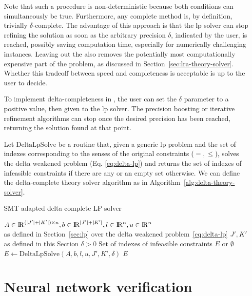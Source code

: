 \documentclass[runningheads]{llncs}
\begin{document}
Note that such a procedure is non-deterministic because both conditions can simultaneously be true.
Furthermore, any complete method is, by definition, trivially $\delta$-complete.
The advantage of this approach is that the \gls{lp} solver can stop refining the solution as soon as the arbitrary precision $\delta$, indicated by the user, is reached, possibly saving computation time, especially for numerically challenging instances.
Leaving out the \nqcs also removes the potentially most computationally expensive part of the problem, as discussed in Section~\ref{sec:lra-theory-solver}.
Whether this tradeoff between speed and completeness is acceptable is up to the user to decide.

To implement delta-completeness in \dlinear, the user can set the $\delta$ parameter to a positive value, then given to the \gls{lp} solver.
The precision boosting or iterative refinement algorithms can stop once the desired precision has been reached, returning the solution found at that point.

Let $\text{DeltaLpSolve}$ be a routine that, given a generic \gls{lp} problem and the set of indexes corresponding to the senses of the original constraints ($=, \le$), solves the delta weakened problem (Eq. \eqref{eq:delta-lp}) and returns the set of indexes of infeasible constraints if there are any or an empty set otherwise.
We can define the delta-complete theory solver algorithm as in Algorithm~\ref{alg:delta-theory-solver}.

\begin{algorithm}
    \caption{SMT adapted delta complete LP solver}\label{alg:delta-theory-solver}
    \begin{algorithmic}
        \Require $A \in {\rm I\!R}^{(|J'| + |K'|) \times n}, b \in {\rm I\!R}^{|J'| + |K'|}, l \in {\rm I\!R}^n, u \in {\rm I\!R}^n$ \\
        \qquad as defined in Section~\ref{sec:lp} over the delta weakened problem~\eqref{eq:delta-lp}
        \Require $J', K'$ as defined in this Section
        \Require $\delta > 0$
        \Ensure Set of indexes of infeasible constraints $E$ or $\emptyset$
        \State $E \gets \text{DeltaLpSolve}(A, b, l, u, J', K', \delta)$ 
        \State \Return $E$
    \end{algorithmic}
\end{algorithm}


\section{Neural network verification}
\label{sec:nn-verification}
\end{document}
